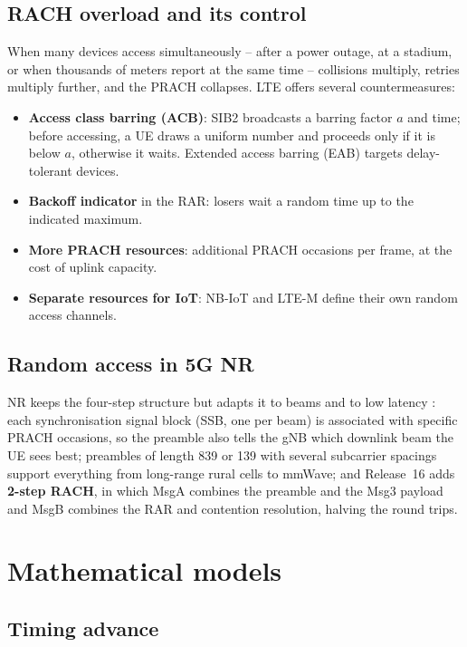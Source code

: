 \documentclass[11pt,a4paper]{article}
\begin{document}
\subsection{RACH overload and its control}
When many devices access simultaneously -- after a power outage, at a stadium, or when thousands of
meters report at the same time -- collisions multiply, retries multiply further, and the PRACH collapses.
LTE offers several countermeasures:
\begin{itemize}
  \item \textbf{Access class barring (ACB)}: SIB2 broadcasts a barring factor $a$ and time; before
        accessing, a UE draws a uniform number and proceeds only if it is below $a$, otherwise it waits.
        Extended access barring (EAB) targets delay-tolerant devices.
  \item \textbf{Backoff indicator} in the RAR: losers wait a random time up to the indicated maximum.
  \item \textbf{More PRACH resources}: additional PRACH occasions per frame, at the cost of uplink
        capacity.
  \item \textbf{Separate resources for IoT}: NB-IoT and LTE-M define their own random access channels.
\end{itemize}

\subsection{Random access in 5G NR}
NR keeps the four-step structure but adapts it to beams and to low latency \cite{ts38300}: each
synchronisation signal block (SSB, one per beam) is associated with specific PRACH occasions, so the
preamble also tells the gNB which downlink beam the UE sees best; preambles of length 839 or 139 with
several subcarrier spacings support everything from long-range rural cells to mmWave; and Release~16
adds \textbf{2-step RACH}, in which MsgA combines the preamble and the Msg3 payload and MsgB combines the
RAR and contention resolution, halving the round trips.

\section{Mathematical models}

\subsection{Timing advance}\label{sec:ta}
\end{document}
